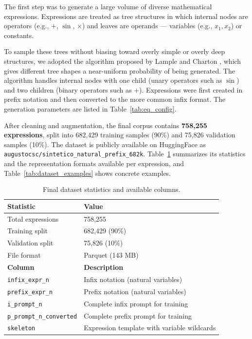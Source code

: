 The first step was to generate a large volume of diverse mathematical expressions. Expressions are treated as tree structures in which internal nodes are operators (e.g., $+$, $\sin$, $\times$) and leaves are operands --- variables (e.g., $x_1, x_2$) or constants.

To sample these trees without biasing toward overly simple or overly deep structures, we adopted the algorithm proposed by Lample and Charton \cite{lample2019deep}, which gives different tree shapes a near-uniform probability of being generated. The algorithm handles internal nodes with one child (unary operators such as $\sin$) and two children (binary operators such as $+$). Expressions were first created in prefix notation and then converted to the more common infix format. The generation parameters are listed in Table~\ref{tab:eq_config}.

After cleaning and augmentation, the final corpus contains \textbf{758{,}255 expressions}, split into 682{,}429 training samples (90\%) and 75{,}826 validation samples (10\%). The dataset is publicly available on HuggingFace as \texttt{augustocsc/sintetico\_natural\_prefix\_682k}. Table~\ref{tab:dataset_stats} summarizes its statistics and the representation formats available per expression, and Table~\ref{tab:dataset_examples} shows concrete examples.

\begin{table}[htbp]
    \centering
    \caption{Final dataset statistics and available columns.}
    \label{tab:dataset_stats}
    \begin{tabular}{ll}
    \toprule
    \textbf{Statistic} & \textbf{Value} \\
    \midrule
    Total expressions & 758{,}255 \\
    Training split & 682{,}429 (90\%) \\
    Validation split & 75{,}826 (10\%) \\
    File format & Parquet (143 MB) \\
    \midrule
    \textbf{Column} & \textbf{Description} \\
    \midrule
    \texttt{infix\_expr\_n} & Infix notation (natural variables) \\
    \texttt{prefix\_expr\_n} & Prefix notation (natural variables) \\
    \texttt{i\_prompt\_n} & Complete infix prompt for training \\
    \texttt{p\_prompt\_n\_converted} & Complete prefix prompt for training \\
    \texttt{skeleton} & Expression template with variable wildcards \\
    \bottomrule
    \end{tabular}
\end{table}


